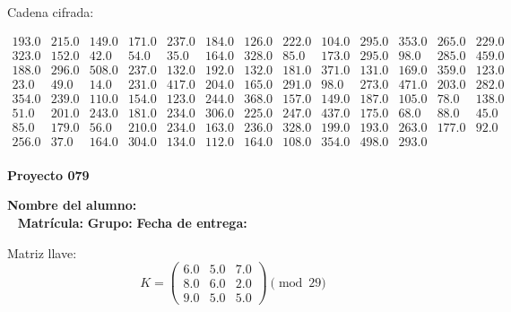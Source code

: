 \documentclass[12pt]{article}
\begin{document}
Cadena cifrada:
\begin{center}
$\begin{array}{lllllllllllll}
193.0 & 215.0 & 149.0 & 171.0 & 237.0 & 184.0 & 126.0 & 222.0 & 104.0 & 295.0 & 353.0 & 265.0 & 229.0\\
323.0 & 152.0 & 42.0 & 54.0 & 35.0 & 164.0 & 328.0 & 85.0 & 173.0 & 295.0 & 98.0 & 285.0 & 459.0\\
188.0 & 296.0 & 508.0 & 237.0 & 132.0 & 192.0 & 132.0 & 181.0 & 371.0 & 131.0 & 169.0 & 359.0 & 123.0\\
23.0 & 49.0 & 14.0 & 231.0 & 417.0 & 204.0 & 165.0 & 291.0 & 98.0 & 273.0 & 471.0 & 203.0 & 282.0\\
354.0 & 239.0 & 110.0 & 154.0 & 123.0 & 244.0 & 368.0 & 157.0 & 149.0 & 187.0 & 105.0 & 78.0 & 138.0\\
51.0 & 201.0 & 243.0 & 181.0 & 234.0 & 306.0 & 225.0 & 247.0 & 437.0 & 175.0 & 68.0 & 88.0 & 45.0\\
85.0 & 179.0 & 56.0 & 210.0 & 234.0 & 163.0 & 236.0 & 328.0 & 199.0 & 193.0 & 263.0 & 177.0 & 92.0\\
256.0 & 37.0 & 164.0 & 304.0 & 134.0 & 112.0 & 164.0 & 108.0 & 354.0 & 498.0 & 293.0\\
\end{array}$
\end{center}

\newpage


\textbf{Proyecto 079}

\textbf{Nombre del alumno:} \underline{\hspace{13cm}}\\\
\vspace{1cm}
\textbf{Matrícula:} \underline{\hspace{4cm}} \hspace{1cm}
\textbf{Grupo:} \underline{\hspace{2cm}}
\textbf{Fecha de entrega:} \underline{\hspace{2cm}}

\medskip

Matriz llave:
\[
K = \begin{pmatrix}
6.0 & 5.0 & 7.0\\
8.0 & 6.0 & 2.0\\
9.0 & 5.0 & 5.0
\end{pmatrix} \pmod{29}
\]
\end{document}
